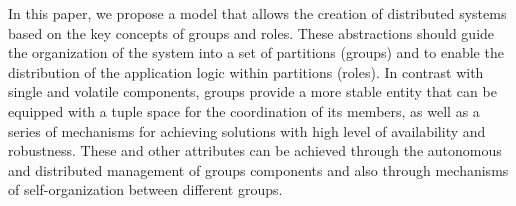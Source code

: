 %
%
In this paper, we propose a model that allows the creation of distributed systems based on the key concepts of groups and roles. These abstractions should guide the organization of the system into a set of partitions (groups) and to enable the distribution of the application logic within partitions (roles). In contrast with single and volatile components, groups provide a more stable entity that can be equipped with a tuple space for the coordination of its members, as well as a series of mechanisms for achieving solutions with high level of availability and robustness. These and other attributes can be achieved through the autonomous and distributed management of groups components and also through mechanisms of self-organization between different groups.




